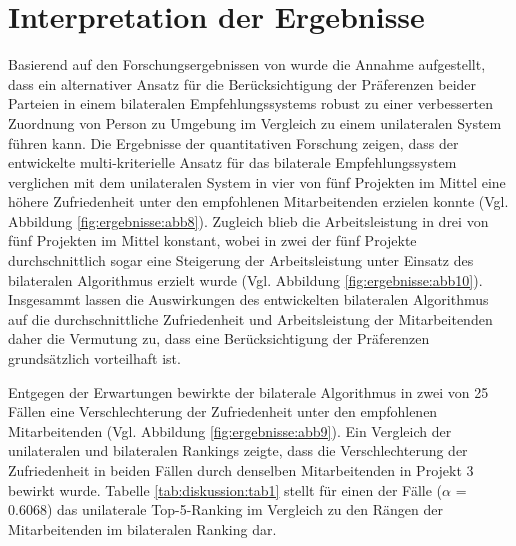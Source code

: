 \section{Interpretation der Ergebnisse}
Basierend auf den Forschungsergebnissen von \textcite[S.1 ff.]{link:booklet} wurde die Annahme aufgestellt, dass ein alternativer Ansatz für die Berücksichtigung der Präferenzen beider Parteien in einem bilateralen Empfehlungssystems robust zu einer verbesserten Zuordnung von Person zu Umgebung im Vergleich zu einem unilateralen System führen kann.
Die Ergebnisse der quantitativen Forschung zeigen, dass der entwickelte multi-kriterielle Ansatz für das bilaterale Empfehlungssystem verglichen mit dem unilateralen System in vier von fünf Projekten im Mittel eine höhere Zufriedenheit unter den empfohlenen Mitarbeitenden erzielen konnte (Vgl. Abbildung \ref{fig:ergebnisse:abb8}).
Zugleich blieb die Arbeitsleistung in drei von fünf Projekten im Mittel konstant, wobei in zwei der fünf Projekte durchschnittlich sogar eine Steigerung der Arbeitsleistung unter Einsatz des bilateralen Algorithmus erzielt wurde (Vgl. Abbildung \ref{fig:ergebnisse:abb10}).
Insgesammt lassen die Auswirkungen des entwickelten bilateralen Algorithmus auf die durchschnittliche Zufriedenheit und Arbeitsleistung der Mitarbeitenden daher die Vermutung zu, dass eine Berücksichtigung der Präferenzen grundsätzlich vorteilhaft ist.

Entgegen der Erwartungen bewirkte der bilaterale Algorithmus in zwei von 25 Fällen eine Verschlechterung der Zufriedenheit unter den empfohlenen Mitarbeitenden (Vgl. Abbildung \ref{fig:ergebnisse:abb9}).
Ein Vergleich der unilateralen und bilateralen Rankings zeigte, dass die Verschlechterung der Zufriedenheit in beiden Fällen durch denselben Mitarbeitenden in Projekt 3 bewirkt wurde.
Tabelle \ref{tab:diskussion:tab1} stellt für einen der Fälle ($\alpha$ = 0.6068) das unilaterale Top-5-Ranking im Vergleich zu den Rängen der Mitarbeitenden im bilateralen Ranking dar.

